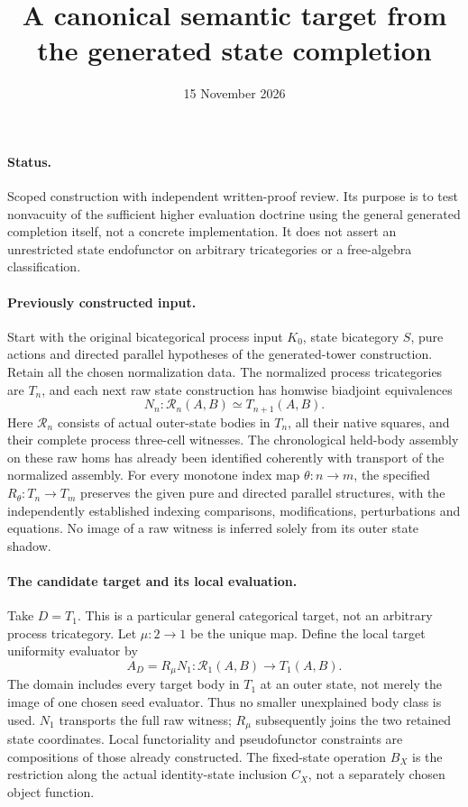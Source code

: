 \documentclass{article}
\title{A canonical semantic target from the generated state completion}
\date{15 November 2026}
\begin{document}
\maketitle
\paragraph{Status.} Scoped construction with independent written-proof review. Its purpose is to test nonvacuity of the sufficient higher evaluation doctrine using the general generated completion itself, not a concrete implementation. It does not assert an unrestricted state endofunctor on arbitrary tricategories or a free-algebra classification.

\paragraph{Previously constructed input.} Start with the original bicategorical process input $K_0$, state bicategory $S$, pure actions and directed parallel hypotheses of the generated-tower construction. Retain all the chosen normalization data. The normalized process tricategories are $T_n$, and each next raw state construction has homwise biadjoint equivalences
\[
 N_n:\mathcal R_n(A,B)\simeq T_{n+1}(A,B).
\]
Here $\mathcal R_n$ consists of actual outer-state bodies in $T_n$, all their native squares, and their complete process three-cell witnesses. The chronological held-body assembly on these raw homs has already been identified coherently with transport of the normalized assembly. For every monotone index map $\theta:n\to m$, the specified $R_\theta:T_n\to T_m$ preserves the given pure and directed parallel structures, with the independently established indexing comparisons, modifications, perturbations and equations. No image of a raw witness is inferred solely from its outer state shadow.

\paragraph{The candidate target and its local evaluation.} Take $D=T_1$. This is a particular general categorical target, not an arbitrary process tricategory. Let $\mu:2\to1$ be the unique map. Define the local target uniformity evaluator by
\[
 A_D=R_\mu N_1:\mathcal R_1(A,B)\longrightarrow T_1(A,B).
\]
The domain includes every target body in $T_1$ at an outer state, not merely the image of one chosen seed evaluator. Thus no smaller unexplained body class is used. $N_1$ transports the full raw witness; $R_\mu$ subsequently joins the two retained state coordinates. Local functoriality and pseudofunctor constraints are compositions of those already constructed. The fixed-state operation $B_X$ is the restriction along the actual identity-state inclusion $C_X$, not a separately chosen object function.
\end{document}
